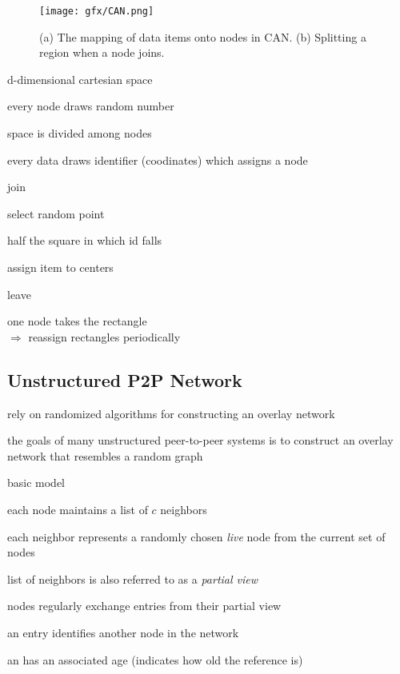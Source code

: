 \documentclass[ngerman,a4paper]{report}
\begin{document}
\begin{figure}[h]
	\centering
	\texttt{[image: gfx/CAN.png]}
	\caption{(a) The mapping of data items onto nodes in CAN. (b) Splitting a region when a node joins.}
	\label{img:CAN}
\end{figure}

\begin{compactitem}
\item d-dimensional cartesian space
\item every node draws random number
\item space is divided among nodes
\item every data draws identifier (coodinates) which assigns a node

\item join\begin{compactitem}
\item select random point
\item half the square in which id falls
\item assign item to centers
\end{compactitem}
\item leave\begin{compactitem}
\item one node takes the rectangle\\
$\Rightarrow$ reassign rectangles periodically
\end{compactitem}
\end{compactitem}

\subsection{Unstructured P2P Network}

\begin{compactitem}
	\item rely on randomized algorithms for constructing an overlay network
	\item  the goals of many unstructured peer-to-peer systems is to construct an overlay network that resembles a random graph
	\item  basic model 
	\begin{compactitem}
		\item each node maintains a list of $c$ neighbors
		\item each neighbor represents a randomly chosen \emph{live} node from the current set of nodes
		\item list of neighbors is also referred to as a \emph{partial view}
		\item nodes regularly exchange entries from their partial view
		\item an entry identifies another node in the network
		\item an has an associated age (indicates how old the reference is)
	\end{compactitem}
\end{compactitem}
\end{document}
